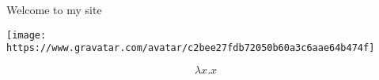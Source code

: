 

Welcome to my site

\texttt{[image: https://www.gravatar.com/avatar/c2bee27fdb72050b60a3c6aae64b474f]}


$$\lambda x . x$$


